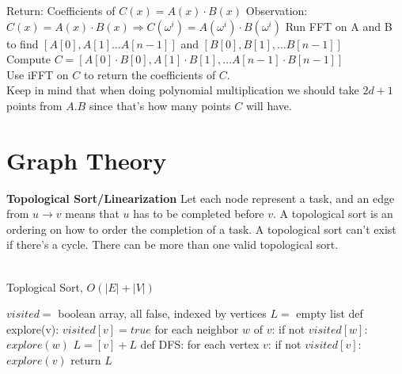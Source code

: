 \documentclass{article}
\begin{document}
\begin{multicols}{2}
Return: Coefficients of $C(x) = A(x) \cdot B(x)$ \newline 
Observation: $C(x) = A(x) \cdot B(x) \Longrightarrow C(\omega^i) = A(\omega^i) \cdot B(\omega^i)$ \newline 
Run FFT on A and B to find $[A[0], A[1] \ldots A[n-1]]$ and $[B[0], B[1], \ldots B[n-1]]$ \\
Compute $C = [A[0] \cdot B[0], A[1] \cdot B[1], \ldots A[n-1] \cdot B[n-1]]$ \\
Use iFFT on $C$ to return the coefficients of $C$. \\
Keep in mind that when doing polynomial multiplication we should take $2d+1$ points from $A. B$ since that's how many points $C$ will have. 
\section*{Graph Theory}
\textbf{Topological Sort/Linearization} \newline 
Let each node represent a task, and an edge from $u \to v$ means that $u$ has to be completed before $v$. \newline 
A topological sort is an ordering on how to order the completion of a task. A topological sort can't exist if there's a cycle. There can be more than one valid topological sort. \\ \\
\setlength{\textfloatsep}{0.0cm}
\begin{algorithm}[H]
\label{alg:quad}
\caption{Toplogical Sort, $O(|E| + |V|)$}\label{euclid}
\begin{algorithmic}[1]
\State $visited =$ boolean array, all false, indexed by vertices
\State $L =$ empty list
\State def explore(v):
\Indent
\State $visited[v] = true$
\State for each neighbor $w$ of $v$: 
\Indent 
\State if not $visited[w]$: 
\Indent 
\State $explore(w)$
\EndIndent 
\State $L = [v] + L$
\EndIndent
\EndIndent
\State def DFS:
\Indent
\State for each vertex $v$: 
\Indent 
\State if not $visited[v]$: 
\Indent 
\State $explore(v)$
\EndIndent 
\EndIndent
\State return $L$
\EndIndent
\end{algorithmic}
\end{algorithm}
\setlength{\floatsep}{0.0cm}


\end{multicols}
\end{document}
